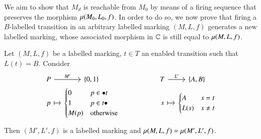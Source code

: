 We aim to show that $M_d$ is reachable from $M_0$ by means of a firing sequence that preserves the morphism $\mu(M_0,L_0,f)$. In order to do so, we now prove that firing a $B$-labelled transition in an arbitrary labelled marking $(M,L,f)$ generates a new labelled marking, whose associated morphism in $\mathbb C$ is still equal to $\mu(M,L,f)$.

\begin{proposition}\label{prop:fired labelled marking is equal to original one}
	Let $(M,L,f)$ be a labelled marking, $t \in T$ an enabled transition such that $L(t) = B$. Consider 
	\begin{equation}\label{markings after firing definition}
	\begin{tikzcd}[row sep=0em,column sep=1em,ampersand replacement=\&]
	P \ar[r,"M'"] \& \{0,1\} \& \& \& \& \& T \ar[r,"L'"] \& \{A,B\} \\
	p \ar[r,|->] \& \begin{cases}
	0 & p \in \inp t \\
	1 & p \in \out t \\
	M(p) & \text{otherwise}
	\end{cases}
	\& \& \& \& \&
	s \ar[r,|->] \& \begin{cases}
	A & s = t \\
	L(s) & s \ne t
	\end{cases}
	\end{tikzcd}
	\end{equation}
	Then $(M',L',f)$ is a labelled marking and $\mu(M,L,f) = \mu(M',L',f)$.
\end{proposition} 
